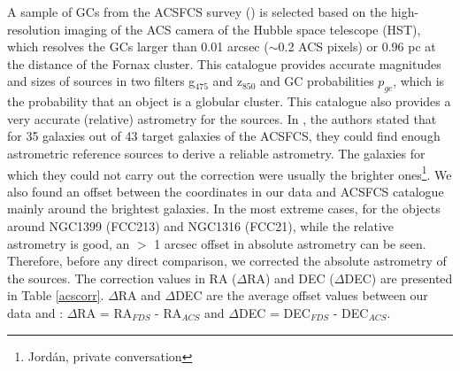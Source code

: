 \documentclass[fleqn,usenatbib]{mnras}
\begin{document}
A sample of GCs from the ACSFCS survey (\citealp{jordan2015}) is selected based on the high-resolution imaging of the ACS camera of the Hubble space telescope (HST), which resolves the GCs larger than 0.01 arcsec ($\sim$0.2 ACS pixels) or 0.96 pc at the distance of the Fornax cluster. This catalogue provides accurate magnitudes and sizes of sources in two filters g$_{475}$ and z$_{850}$ and GC probabilities $p_{gc}$, which is the probability that an object is a globular cluster. This catalogue also provides a very accurate (relative) astrometry for the sources. In \citet{jordan2007}, the authors stated that for 35 galaxies out of 43 target galaxies of the ACSFCS, they could find enough astrometric reference sources to derive a reliable astrometry. The galaxies for which they could not carry out the correction were usually the brighter ones\footnote{Jord{\'a}n, private conversation}. We also found an offset between the coordinates in our data and ACSFCS catalogue mainly around the brightest galaxies. In the most extreme cases, for the objects around NGC1399 (FCC213) and NGC1316 (FCC21), while the relative astrometry is good, an $>$ 1 arcsec offset in absolute astrometry can be seen. Therefore, before any direct comparison, we corrected the absolute astrometry of the sources. The correction values in RA ($\Delta$RA) and DEC ($\Delta$DEC) are presented in Table \ref{acscorr}. $\Delta$RA and $\Delta$DEC are the average offset values between our data and \citet{jordan2015}: $\Delta$RA = RA$_{FDS}$ - RA$_{ACS}$ and
$\Delta$DEC = DEC$_{FDS}$ - DEC$_{ACS}$.
\\
\end{document}
